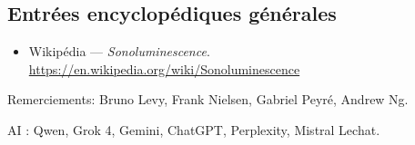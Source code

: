 \documentclass[a4paper,12pt]{article}
\begin{document}
\subsection*{Entrées encyclopédiques générales}
\begin{itemize}
\item Wikipédia — \textit{Sonoluminescence}. \url{https://en.wikipedia.org/wiki/Sonoluminescence}
\end{itemize}
Remerciements: 
Bruno Levy, Frank Nielsen, Gabriel Peyré, Andrew Ng.

AI : Qwen, Grok 4, Gemini, ChatGPT, Perplexity, Mistral Lechat.
\end{document}
